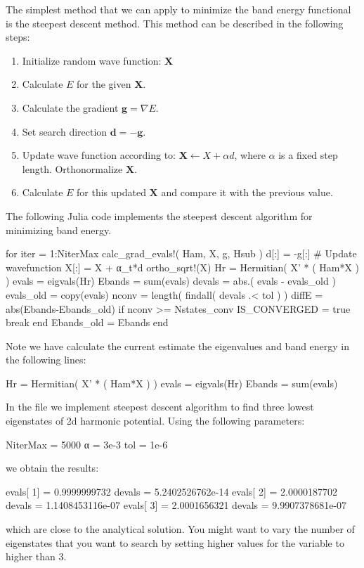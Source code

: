 The simplest method that we can apply to minimize the band energy functional is
the steepest descent method. This method can be described in the following steps:
\begin{enumerate}
\item Initialize random wave function: $\mathbf{X}$
\item Calculate $E$ for the given $\mathbf{X}$.
\item Calculate the gradient $\mathbf{g} = \nabla E$.
\item Set search direction $\mathbf{d} = -\mathbf{g}$.
\item Update wave function according to: $\mathbf{X} \leftarrow X + \alpha d$, where $\alpha$ is
a fixed step length. Orthonormalize $\mathbf{X}$.
\item Calculate $E$ for this updated $\mathbf{X}$ and compare it with the previous value.
\end{enumerate}

The following Julia code implements the steepest descent algorithm for minimizing band energy.
\begin{juliacode}
for iter = 1:NiterMax
    calc_grad_evals!( Ham, X, g, Hsub )
    d[:] = -g[:]
    # Update wavefunction
    X[:] = X + α_t*d
    ortho_sqrt!(X)
    Hr = Hermitian( X' * ( Ham*X ) )
    evals = eigvals(Hr)
    Ebands = sum(evals)
    devals = abs.( evals - evals_old )
    evals_old = copy(evals)
    nconv = length( findall( devals .< tol ) )
    diffE = abs(Ebands-Ebands_old)
    if nconv >= Nstates_conv
        IS_CONVERGED = true
        break
    end
    Ebands_old = Ebands
end
\end{juliacode}

Note we have calculate the current estimate the eigenvalues and band energy in the following
lines:
\begin{juliacode}
Hr = Hermitian( X' * ( Ham*X ) )
evals = eigvals(Hr)
Ebands = sum(evals)
\end{juliacode}

In the file  we
implement steepest descent algorithm
to find three lowest eigenstates of 2d harmonic potential.
Using the following parameters:
\begin{juliacode}
NiterMax = 5000
α = 3e-3
tol = 1e-6
\end{juliacode}
we obtain the results:
\begin{textcode}
evals[  1] =       0.9999999732 devals =   5.2402526762e-14
evals[  2] =       2.0000187702 devals =   1.1408453116e-07
evals[  3] =       2.0001656321 devals =   9.9907378681e-07  
\end{textcode}
which are close to the analytical solution. You might want to vary the number of eigenstates
that you want to search by setting higher values for the variable  to
higher than 3.

